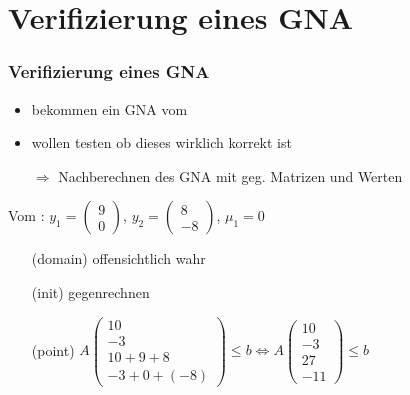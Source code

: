 \section{Verifizierung eines GNA}
\frame{\tableofcontents[currentsection]}
\begin{frame}
	\frametitle{\color{white}Verifizierung eines GNA}
	\begin{itemize}
		\item bekommen ein GNA vom \solver
		\item wollen testen ob dieses wirklich korrekt ist
		\item[$\Rightarrow$] Nachberechnen des GNA mit geg. Matrizen und Werten
	\end{itemize}
	\begin{example}
		Vom \solver: $y_1=\begin{pmatrix} 9 \\ 0 \end{pmatrix}$, $y_2=\begin{pmatrix} 8 \\ -8 \end{pmatrix}$, $\mu_1=0$\newline
		\begin{itemize}
			\setlength{\itemindent}{1.5cm}
			\item[(domain)] offensichtlich wahr \checkmark
			\item[(init)] gegenrechnen \stem \checkmark %
			\item[(point)]  $A\begin{pmatrix} 10 \\ -3 \\ 10+9+8 \\ -3 + 0 + (-8) \end{pmatrix} \le b \Leftrightarrow A\begin{pmatrix} 10 \\ -3 \\ 27 \\ -11 \end{pmatrix} \le b$ \checkmark
		\end{itemize}
	\end{example}
\end{frame}


